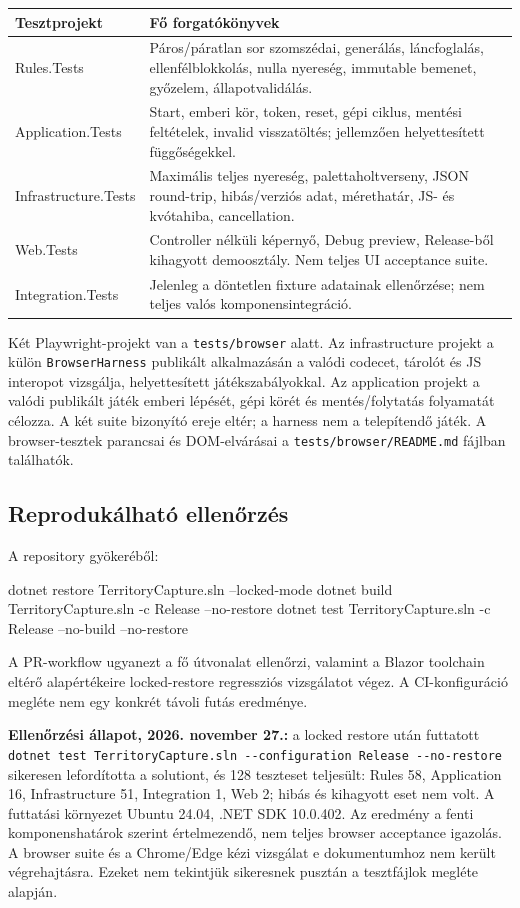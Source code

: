 \documentclass[11pt,a4paper]{article}
\newcommand{\code}[1]{\nolinkurl{#1}}
\begin{document}
\begin{tabularx}{\linewidth}{@{}lY@{}}\toprule
Tesztprojekt & Fő forgatókönyvek \\\midrule
Rules.Tests & Páros/páratlan sor szomszédai, generálás, láncfoglalás, ellenfélblokkolás, nulla nyereség, immutable bemenet, győzelem, állapotvalidálás.\\
Application.Tests & Start, emberi kör, token, reset, gépi ciklus, mentési feltételek, invalid visszatöltés; jellemzően helyettesített függőségekkel.\\
Infrastructure.Tests & Maximális teljes nyereség, palettaholtverseny, JSON round-trip, hibás/verziós adat, mérethatár, JS- és kvótahiba, cancellation.\\
Web.Tests & Controller nélküli képernyő, Debug preview, Release-ből kihagyott demoosztály. Nem teljes UI acceptance suite.\\
Integration.Tests & Jelenleg a döntetlen fixture adatainak ellenőrzése; nem teljes valós komponensintegráció.\\\bottomrule
\end{tabularx}

Két Playwright-projekt van a \code{tests/browser} alatt. Az infrastructure projekt a külön \code{BrowserHarness} publikált alkalmazásán a valódi codecet, tárolót és JS interopot vizsgálja, helyettesített játékszabályokkal. Az application projekt a valódi publikált játék emberi lépését, gépi körét és mentés/folytatás folyamatát célozza. A két suite bizonyító ereje eltér; a harness nem a telepítendő játék. A browser-tesztek parancsai és DOM-elvárásai a \code{tests/browser/README.md} fájlban találhatók.

\subsection{Reprodukálható ellenőrzés}
A repository gyökeréből:
\begin{commands}
dotnet restore TerritoryCapture.sln --locked-mode
dotnet build TerritoryCapture.sln -c Release --no-restore
dotnet test TerritoryCapture.sln -c Release --no-build --no-restore
\end{commands}
A PR-workflow ugyanezt a fő útvonalat ellenőrzi, valamint a Blazor toolchain eltérő alapértékeire locked-restore regressziós vizsgálatot végez. A CI-konfiguráció megléte nem egy konkrét távoli futás eredménye.

\textbf{Ellenőrzési állapot, 2026. november 27.:} a locked restore után futtatott \code{dotnet test TerritoryCapture.sln --configuration Release --no-restore} sikeresen lefordította a solutiont, és 128 teszteset teljesült: Rules 58, Application 16, Infrastructure 51, Integration 1, Web 2; hibás és kihagyott eset nem volt. A futtatási környezet Ubuntu 24.04, .NET SDK 10.0.402. Az eredmény a fenti komponenshatárok szerint értelmezendő, nem teljes browser acceptance igazolás. A browser suite és a Chrome/Edge kézi vizsgálat e dokumentumhoz nem került végrehajtásra. Ezeket nem tekintjük sikeresnek pusztán a tesztfájlok megléte alapján.
\end{document}
